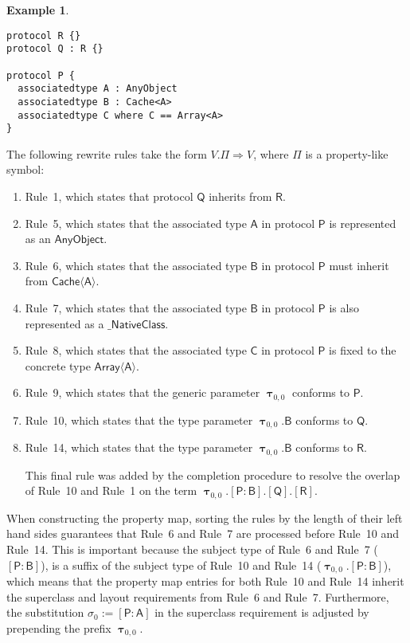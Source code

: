 \documentclass[a4paper,headsepline,bibliography=totoc,toc=flat,fleqn,twoside=semi]{scrbook}
\theoremstyle{definition}
\theoremstyle{definition}
\newtheorem{example}{Example}[chapter]
\theoremstyle{definition}
\newcommand{\namesym}[1]{\mathsf{#1}}
\newcommand{\proto}[1]{\bm{\mathsf{#1}}}
\newcommand{\protosym}[1]{[\proto{#1}]}
\newcommand{\genericsym}[2]{\bm{\uptau}_{#1,#2}}
\newcommand{\assocsym}[2]{[\proto{#1}\colon\namesym{#2}]}
\begin{document}
\begin{example}
\begin{listing}
\begin{Verbatim}
protocol R {}
protocol Q : R {}

protocol P {
  associatedtype A : AnyObject
  associatedtype B : Cache<A>
  associatedtype C where C == Array<A>
}
\end{Verbatim}
\end{listing}
The following rewrite rules take the form $V.\Pi\Rightarrow V$, where $\Pi$ is a property-like symbol:
\begin{enumerate}
\item Rule~1, which states that protocol $\proto{Q}$ inherits from $\proto{R}$.
\item Rule~5, which states that the associated type $\namesym{A}$ in protocol $\proto{P}$ is represented as an $\namesym{AnyObject}$.
\item Rule~6, which states that the associated type $\namesym{B}$ in protocol $\proto{P}$ must inherit from $\namesym{Cache}\langle\namesym{A}\rangle$.
\item Rule~7, which states that the associated type $\namesym{B}$ in protocol $\proto{P}$ is also represented as a $\namesym{\_NativeClass}$.
\item Rule~8, which states that the associated type $\namesym{C}$ in protocol $\proto{P}$ is fixed to the concrete type $\namesym{Array}\langle\namesym{A}\rangle$.
\item Rule~9, which states that the generic parameter $\genericsym{0}{0}$ conforms to $\proto{P}$.
\item Rule~10, which states that the type parameter $\genericsym{0}{0}.\namesym{B}$ conforms to $\proto{Q}$.
\item Rule~14, which states that the type parameter $\genericsym{0}{0}.\namesym{B}$ conforms to $\proto{R}$.

This final rule was added by the completion procedure to resolve the overlap of Rule~10 and Rule~1 on the term $\genericsym{0}{0}.\assocsym{P}{B}.\protosym{Q}.\protosym{R}$.
\end{enumerate}
When constructing the property map, sorting the rules by the length of their left hand sides guarantees that Rule~6 and Rule~7 are processed before Rule~10 and Rule~14. This is important because the subject type of Rule~6 and Rule~7 ($\assocsym{P}{B}$), is a suffix of the subject type of Rule~10 and Rule~14 ($\genericsym{0}{0}.\assocsym{P}{B}$), which means that the property map entries for both Rule~10 and Rule~14 inherit the superclass and layout requirements from Rule~6 and Rule~7. Furthermore, the substitution $\sigma_0:=\assocsym{P}{A}$ in the superclass requirement is adjusted by prepending the prefix $\genericsym{0}{0}$.


\end{example}
\end{document}
